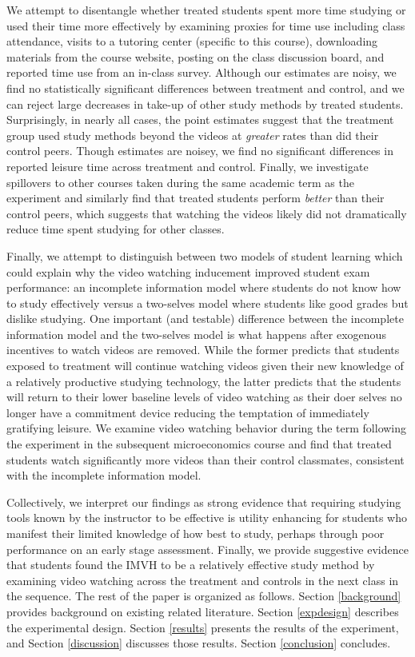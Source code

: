 \documentclass[12pt]{article}
\begin{document}
We attempt to disentangle whether treated students spent more time studying or used their time more effectively by examining proxies for time use including class attendance, visits to a tutoring center (specific to this course), downloading materials from the course website, posting on the class discussion board, and reported time use from an in-class survey. Although our estimates are noisy, we find no statistically significant differences between treatment and control, and we can reject large decreases in take-up of other study methods by treated students. Surprisingly, in nearly all cases, the point estimates suggest that the treatment group used study methods beyond the videos at \textit{greater} rates than did their control peers. Though estimates are noisey, we find no significant differences in reported leisure time across treatment and control. Finally, we investigate spillovers to other courses taken during the same academic term as the experiment and similarly find that treated students perform \textit{better} than their control peers, which suggests that watching the videos likely did not dramatically reduce time spent studying for other classes.

Finally, we attempt to distinguish between two models of student learning which could explain why the video watching inducement improved student exam performance: an incomplete information model where students do not know how to study effectively versus a two-selves model where students like good grades but dislike studying. One important (and testable) difference between the incomplete information model and the two-selves model is what happens after exogenous incentives to watch videos are removed. While the former predicts that students exposed to treatment will continue watching videos given their new knowledge of a relatively productive studying technology, the latter predicts that the students will return to their lower baseline levels of video watching as their doer selves no longer have a commitment device reducing the temptation of immediately gratifying leisure. We examine video watching behavior during the term following the experiment in the subsequent microeconomics course and find that treated students watch significantly more videos than their control classmates, consistent with the incomplete information model.

Collectively, we interpret our findings as strong evidence that requiring studying tools known by the instructor to be effective is utility enhancing for students who manifest their limited knowledge of how best to study, perhaps through poor performance on an early stage assessment. Finally, we provide suggestive evidence that students found the IMVH to be a relatively effective study method by examining video watching across the treatment and controls in the next class in the sequence. The rest of the paper is organized as follows. Section \ref{background} provides background on existing related literature. Section \ref{expdesign} describes the experimental design. Section \ref{results} presents the results of the experiment, and Section \ref{discussion} discusses those results. Section \ref{conclusion} concludes.
\end{document}
